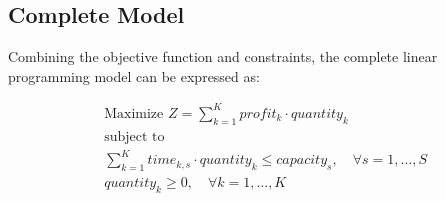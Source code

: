 \documentclass{article}
\begin{document}
\subsection*{Complete Model}
Combining the objective function and constraints, the complete linear programming model can be expressed as:

\[
\begin{align*}
    & \text{Maximize } Z = \sum_{k=1}^{K} profit_k \cdot quantity_k \\
    & \text{subject to} \\
    & \sum_{k=1}^{K} time_{k,s} \cdot quantity_k \leq capacity_s, \quad \forall s = 1, \ldots, S \\
    & quantity_k \geq 0, \quad \forall k = 1, \ldots, K
\end{align*}
\]
\end{document}
